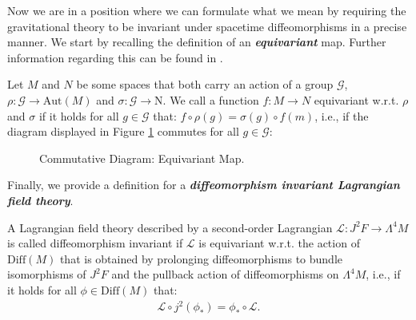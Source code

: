 Now we are in a position where we can formulate what we mean by requiring the gravitational theory to be invariant under spacetime diffeomorphisms in a precise manner. We start by recalling the definition of an \textit{\textbf{equivariant}} map. Further information regarding this can be found in \cite{doi:10.1142/3867}.
\begin{definition}[equivariance]
Let $M$ and $N$ be some spaces that both carry an action of a group $\mathcal{G}$, $\rho : \mathcal{G} \rightarrow \mathrm{Aut}(M)$ and $\sigma : \mathcal{G} \rightarrow \mathrm{N}$. We call a function $f : M \rightarrow N$ equivariant w.r.t. $\rho$ and $\sigma$ if it holds for all $g \in \mathcal{G}$ that: $f \circ \rho(g) = \sigma(g) \circ f(m)$, i.e., if the diagram displayed in Figure \ref{EquiDia} commutes for all $g \in \mathcal{G}$:
\begin{figure}[hbt!]
\centering
{}
\caption{Commutative Diagram: Equivariant Map.}\label{EquiDia}
\end{figure}
\end{definition}
Finally, we provide a definition for a \textit{\textbf{diffeomorphism invariant Lagrangian field theory}}.
\begin{definition}
A Lagrangian field theory described by a second-order Lagrangian $\mathcal{L} : J^2F \rightarrow \Lambda^4 M$ is called diffeomorphism invariant if $\mathcal{L}$ is equivariant w.r.t. the action of $\mathrm{Diff}(M)$ that is obtained by prolonging diffeomorphisms to bundle isomorphisms of $J^2F$ and the pullback action of diffeomorphisms on $\Lambda^4M$, i.e., if it holds for all $\phi \in \mathrm{Diff}(M)$ that: 
\begin{align}
     \mathcal{L}\circ j^2(\phi_{\ast}) = \phi_{\ast} \circ \mathcal{L}.
\end{align}
\end{definition}

